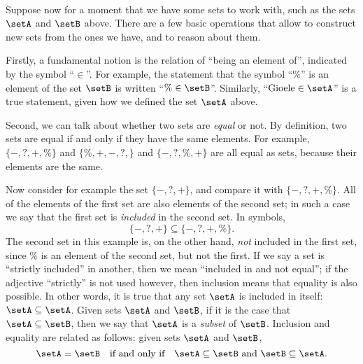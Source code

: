 {

\

Suppose now for a moment that we have some sets to work with, such as the sets $\setA$ and $\setB$ above. There are a few basic operations that allow to construct new sets from the ones we have, and to reason about them. 


Firstly, a fundamental notion is the relation of ``being an element of'', indicated by the symbol ``$\in$''. For example, the statement that the symbol ``$\%$'' is an element of the set $\setB$ is written ``$\% \in \setB$''. Similarly, ``$\text{Gioele} \in \setA$'' is a true statement, given how we defined the set $\setA$ above. 

Second, we can talk about whether two sets are \emph{equal} or not. By definition, two sets are equal if and only if they have the same elements. For example, $\{ -, ?, +, \% \}$ and $\{ \%, +, -, ?, \}$ and $\{ -, ?, \%, + \}$ are all equal as sets, because their elements are the same. 

Now consider for example the set $\{ -, ?, + \}$, and compare it with $\{ -, ?, +, \% \}$. All of the elements of the first set are also elements of the second set; in such a case we say that the first set is \emph{included} in the second set. In symbols,
\begin{equation}
\{ -, ?, + \} \subseteq \{ -, ?, +, \% \}. 
\end{equation}
The second set in this example is, on the other hand, \emph{not} included in the first set, since $\%$ is an element of the second set, but not the first. If we say a set is ``strictly included'' in another, then we mean ``included in and not equal''; if the adjective ``strictly'' is not used however, then inclusion means that equality is also possible. In other words, it is true that any set $\setA$ is included in itself: $\setA \subseteq \setA$. Given sets $\setA$ and $\setB$, if it is the case that $\setA \subseteq \setB$, then we say that $\setA$ is a \emph{subset} of $\setB$. Inclusion and equality are related as follows: given sets $\setA$ and $\setB$, 
\begin{equation}
\setA = \setB \quad \text{if and only if} \quad \setA \subseteq \setB \ \text{and} \ \setB \subseteq \setA.
\end{equation}

}
